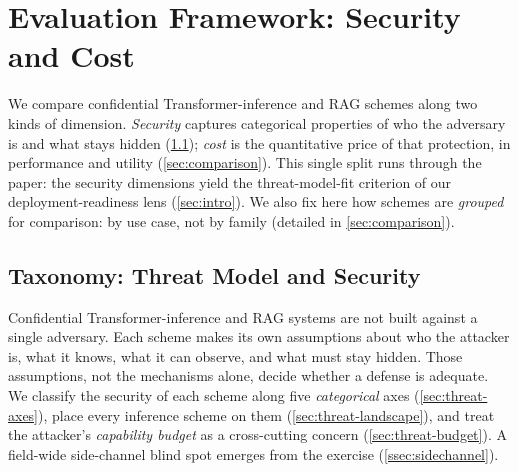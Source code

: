 \section{Evaluation Framework: Security and Cost}
\label{sec:framework}


We compare confidential Transformer-inference and RAG schemes along two kinds of
dimension. \emph{Security} captures categorical properties of who the adversary is and what
stays hidden (\cref{sec:threat}); \emph{cost} is the quantitative price of that
protection, in performance and utility (\cref{sec:comparison}). This single split runs
through the paper: the security dimensions yield the threat-model-fit criterion of our
deployment-readiness lens (\cref{sec:intro}). We also fix here how schemes are
\emph{grouped} for comparison: by use case, not by family (detailed in \cref{sec:comparison}).

\subsection{Taxonomy: Threat Model and Security}
\label{sec:threat}

Confidential Transformer-inference and RAG systems are not built against a single
adversary. Each scheme makes its own assumptions about who the attacker is, what it
knows, what it can observe, and what must stay hidden. Those assumptions, not the
mechanisms alone, decide whether a defense is adequate. We classify the security of each
scheme along five \emph{categorical} axes (\cref{sec:threat-axes}), place
every inference scheme on them (\cref{sec:threat-landscape}), and treat the
attacker's \emph{capability budget} as a cross-cutting concern (\cref{sec:threat-budget}).
A field-wide side-channel blind spot emerges from the exercise (\cref{ssec:sidechannel}).

